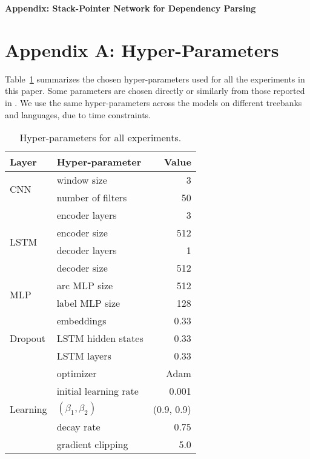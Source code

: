 \documentclass[11pt,a4paper]{article}
\begin{document}



\newpage
\onecolumn
{\centering \large {\bf Appendix: Stack-Pointer Network for Dependency Parsing}} \\
\section*{Appendix A: Hyper-Parameters}
Table~\ref{tab:hyper-params} summarizes the chosen hyper-parameters used for all the experiments in this paper.
Some parameters are chosen directly or similarly from those reported in \citet{dozat2017:ICLR}.
We use the same hyper-parameters across the models on different treebanks and languages, due to time constraints.
\begin{table}[h]
\centering
\begin{tabular}[t]{l|l|r}
\hline
\textbf{Layer} & \textbf{Hyper-parameter} & \textbf{Value} \\
\hline
\multirow{2}{*}{CNN} & window size & 3 \\
 & number of filters & 50 \\
\hline
\multirow{4}{*}{LSTM} & encoder layers & 3 \\
 & encoder size & 512 \\
\cline{2-3}
 & decoder layers & 1 \\
 & decoder size & 512 \\
\hline
\multirow{2}{*}{MLP} & arc MLP size & 512 \\
 & label MLP size & 128 \\
\hline
\multirow{3}{*}{Dropout} & embeddings & 0.33 \\
 & LSTM hidden states & 0.33 \\
 & LSTM layers & 0.33 \\
\hline
\multirow{5}{*}{Learning} & optimizer & Adam \\
 & initial learning rate & 0.001 \\
 & $(\beta_1, \beta_2)$ & (0.9, 0.9) \\
 & decay rate & 0.75 \\
 & gradient clipping & 5.0 \\
\hline
\end{tabular}
\caption{Hyper-parameters for all experiments.}
\label{tab:hyper-params}
\end{table}

\newpage
\end{document}
